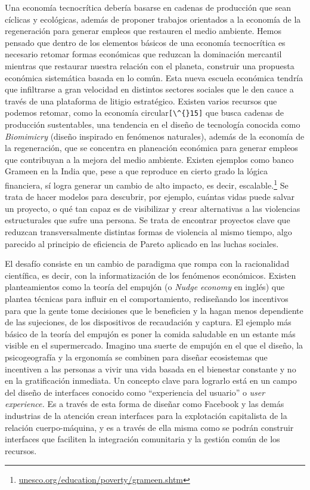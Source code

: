 Una economía tecnocrítica debería basarse en cadenas de producción que sean cíclicas y ecológicas, además de proponer trabajos orientados a la economía de la regeneración para generar empleos que restauren el medio ambiente. Hemos pensado que dentro de los elementos básicos de una economía tecnocrítica es necesario retomar formas económicas que reduzcan la dominación mercantil mientras que restaurar nuestra relación con el planeta, construir una propuesta económica sistemática basada en lo común. Esta nueva escuela económica tendría que infiltrarse a gran velocidad en distintos sectores sociales que le den cauce a través de una plataforma de litigio estratégico. Existen varios recursos que podemos retomar, como la economía circular\verb+[\^{}15]+ que busca cadenas de producción sustentables, una tendencia en el diseño de tecnología conocida como \emph{Biomimicry} (diseño inspirado en fenómenos naturales), además de la economía de la regeneración, que se concentra en planeación económica para generar empleos que contribuyan a la mejora del medio ambiente. Existen ejemplos como banco Grameen en la India que, pese a que reproduce en cierto grado la lógica financiera, sí logra generar un cambio de alto impacto, es decir, escalable.\footnote{\url{unesco.org/education/poverty/grameen.shtm}} Se trata de hacer modelos para descubrir, por ejemplo, cuántas vidas puede salvar un proyecto, o qué tan capaz es de visibilizar y crear alternativas a las violencias estructurales que sufre una persona. Se trata de encontrar proyectos clave que reduzcan transversalmente distintas formas de violencia al mismo tiempo, algo parecido al principio de eficiencia de Pareto aplicado en las luchas sociales.

El desafío consiste en un cambio de paradigma que rompa con la racionalidad científica, es decir, con la informatización de los fenómenos económicos. Existen planteamientos como la teoría del empujón (o \emph{Nudge economy} en inglés) que plantea técnicas para influir en el comportamiento, rediseñando los incentivos para que la gente tome decisiones que le beneficien y la hagan menos dependiente de las sujeciones, de los dispositivos de recaudación y captura. El ejemplo más básico de la teoría del empujón es poner la comida saludable en un estante más visible en el supermercado. Imagino una suerte de empujón en el que el diseño, la psicogeografía y la ergonomía se combinen para diseñar ecosistemas que incentiven a las personas a vivir una vida basada en el bienestar constante y no en la gratificación inmediata. Un concepto clave para lograrlo está en un campo del diseño de interfaces conocido como \enquote{experiencia del usuario} o \emph{user experience.} Es a través de esta forma de diseñar como Facebook y las demás industrias de la atención crean interfaces para la explotación capitalista de la relación cuerpo-máquina, y es a través de ella misma como se podrán construir interfaces que faciliten la integración comunitaria y la gestión común de los recursos.

